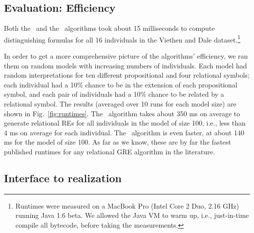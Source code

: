 





\subsection{Evaluation: Efficiency}

Both the \el\ and the \alc\ algorithms took about 15 milliseconds to
compute distinguishing formulas for all 16 individuals in the Viethen
and Dale dataset.\footnote{Runtimes were measured on a MacBook Pro
  (Intel Core 2 Duo, 2.16 GHz) running Java 1.6 beta.  We allowed the
  Java VM to warm up, i.e., just-in-time compile all bytecode, before
  taking the measurements.}

In order to get a more comprehensive picture of the algorithms'
efficiency, we ran them on random models with increasing numbers of
individuals.  Each model had random interpretations for ten different
propositional and four relational symbols; each individual had a 10\%
chance to be in the extension of each propositional symbol, and each
pair of individuals had a 10\% chance to be related by a relational
symbol.  The results (averaged over 10 runs for each model size) are
shown in Fig.~\ref{fig:runtimes}.  The \el\
algorithm takes about 350 ms on average to generate relational REs for
all individuals in the model of size 100, i.e., less than 4 ms on
average for each individual.  The \alc\ algorithm is even faster, at
about 140 ms for the model of size 100.  As far as we know, these are
by far the fastest published runtimes for any relational GRE algorithm
in the literature.




\subsection{Interface to realization}
\label{sec:discussion-realization}


